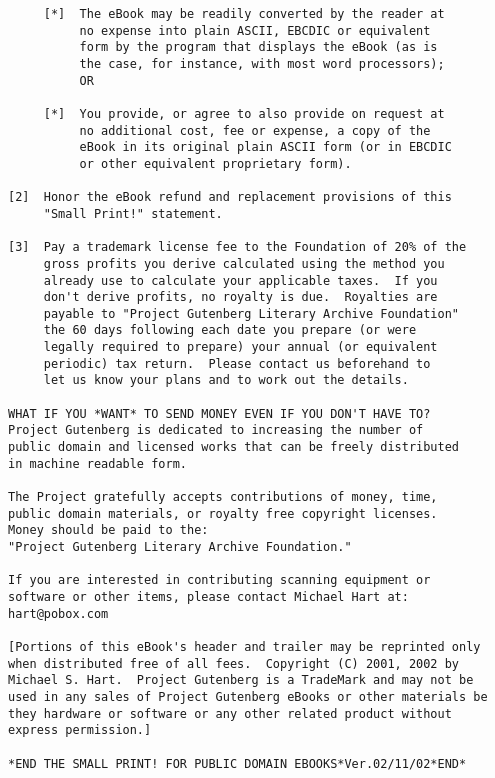 \documentclass[oneside]{book}
\begin{document}
\begin{verbatim}
     [*]  The eBook may be readily converted by the reader at
          no expense into plain ASCII, EBCDIC or equivalent
          form by the program that displays the eBook (as is
          the case, for instance, with most word processors);
          OR

     [*]  You provide, or agree to also provide on request at
          no additional cost, fee or expense, a copy of the
          eBook in its original plain ASCII form (or in EBCDIC
          or other equivalent proprietary form).

[2]  Honor the eBook refund and replacement provisions of this
     "Small Print!" statement.

[3]  Pay a trademark license fee to the Foundation of 20% of the
     gross profits you derive calculated using the method you
     already use to calculate your applicable taxes.  If you
     don't derive profits, no royalty is due.  Royalties are
     payable to "Project Gutenberg Literary Archive Foundation"
     the 60 days following each date you prepare (or were
     legally required to prepare) your annual (or equivalent
     periodic) tax return.  Please contact us beforehand to
     let us know your plans and to work out the details.

WHAT IF YOU *WANT* TO SEND MONEY EVEN IF YOU DON'T HAVE TO?
Project Gutenberg is dedicated to increasing the number of
public domain and licensed works that can be freely distributed
in machine readable form.

The Project gratefully accepts contributions of money, time,
public domain materials, or royalty free copyright licenses.
Money should be paid to the:
"Project Gutenberg Literary Archive Foundation."

If you are interested in contributing scanning equipment or
software or other items, please contact Michael Hart at:
hart@pobox.com

[Portions of this eBook's header and trailer may be reprinted only
when distributed free of all fees.  Copyright (C) 2001, 2002 by
Michael S. Hart.  Project Gutenberg is a TradeMark and may not be
used in any sales of Project Gutenberg eBooks or other materials be
they hardware or software or any other related product without
express permission.]

*END THE SMALL PRINT! FOR PUBLIC DOMAIN EBOOKS*Ver.02/11/02*END*

\end{verbatim}
\end{document}
